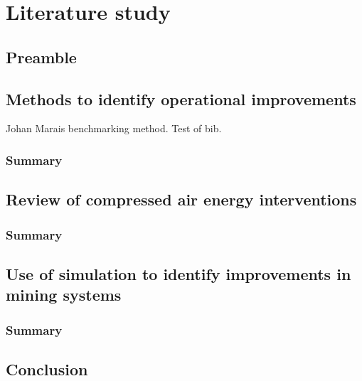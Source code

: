 \chapter{Literature study}
\section{Preamble}
\section{Methods to identify operational improvements}
Johan Marais benchmarking method. Test of bib. 

	\subsection{Summary}
\section{Review of compressed air energy interventions}
	\subsection{Summary}
\section{Use of simulation to identify improvements in mining systems}

	\subsection{Summary}
\section{Conclusion}